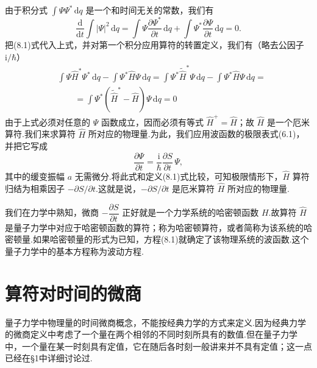 由于积分式 $\int\varPsi\varPsi^{*}\,\mathrm{d}q$ 是一个和时间无关的常数，我们有
\begin{equation*}
  \frac{\mathrm{d}}{\mathrm{d}t}\int|\varPsi|^{2}\,\mathrm{d}q
  =\int\varPsi\frac{\partial\varPsi^{*}}{\partial t}\,\mathrm{d}q
  +\int\varPsi^{*}\frac{\partial\varPsi}{\partial t}\,\mathrm{d}q=0.
\end{equation*}
把(8.1)式代入上式，并对第一个积分应用算符的转置定义，我们有（略去公因子 $\mathrm{i}/\hbar$）
\begin{equation*}
\begin{aligned}
  &\int\varPsi\hat{H}^{*}\varPsi^{*}\,\mathrm{d}q
  -\int\varPsi^{*}\hat{H}\varPsi\,\mathrm{d}q
  =\int\varPsi^{*}\tilde{\hat{H}}^{*}\varPsi\,\mathrm{d}q
  -\int\varPsi^{*}\hat{H}\varPsi\,\mathrm{d}q=\\
  &\qquad=\int\varPsi^{*}\left(\tilde{\hat{H}}^{*}-\hat{H}\right)\varPsi\,\mathrm{d}q=0
\end{aligned}
\end{equation*}
由于上式必须对任意的 $\varPsi$ 函数成立，因而必须有等式 $\hat{H}^{+}=\hat{H}$；故 $\hat{H}$ 是一个厄米算符.我们来求算符 $\hat{H}$ 所对应的物理量.为此，我们应用波函数的极限表式(6.1)，并把它写成
\begin{equation*}
  \frac{\partial\varPsi}{\partial t}
  =\frac{\mathrm{i}}{\hbar}\frac{\partial S}{\partial t}\,\varPsi,
\end{equation*}
其中的缓变振幅 $a$ 无需微分.将此式和定义(8.1)式比较，可知极限情形下，$\hat{H}$ 算符归结为相乘因子 $-\partial S/\partial t$.这就是说，$-\partial S/\partial t$ 是厄米算符 $\hat{H}$ 所对应的物理量.

我们在力学中熟知，微商 $-\dfrac{\partial S}{\partial t}$ 正好就是一个力学系统的哈密顿函数 $H$.故算符 $\hat{H}$ 是量子力学中对应于哈密顿函数的算符；称为哈密顿算符，或者简称为该系统的哈密顿量.如果哈密顿量的形式为已知，方程(8.1)就确定了该物理系统的波函数.这个量子力学中的基本方程称为波动方程.

\section{算符对时间的微商}

量子力学中物理量的时间微商概念，不能按经典力学的方式来定义.因为经典力学的微商定义中考虑了一个量在两个相邻的不同时刻所具有的数值.但在量子力学中，一个量在某一时刻具有定值，它在随后各时刻一般讲来并不具有定值；这一点已经在§1中详细讨论过.

